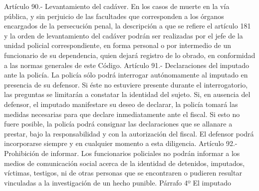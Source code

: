     Artículo 90.- Levantamiento del cadáver. En los casos de muerte en la vía pública, y sin perjuicio de las facultades que corresponden a los órganos encargados de la persecución penal, la descripción a que se refiere el artículo 181 y la orden de levantamiento del cadáver podrán ser realizadas por el jefe de la unidad policial correspondiente, en forma personal o por intermedio de un funcionario de su dependencia, quien dejará registro de lo obrado, en conformidad a las normas generales de este Código.
    Artículo 91.- Declaraciones del imputado ante la policía. La policía sólo podrá interrogar autónomamente al imputado en presencia de su defensor. Si éste no estuviere presente durante el interrogatorio, las preguntas se limitarán a constatar la identidad del sujeto.
    Si, en ausencia del defensor, el imputado manifestare su deseo de declarar, la policía tomará las medidas necesarias para que declare inmediatamente ante el fiscal. Si esto no fuere posible, la policía podrá consignar las declaraciones que se allanare a prestar, bajo la responsabilidad y con la autorización del fiscal. El defensor podrá incorporarse siempre y en cualquier momento a esta diligencia.
    Artículo 92.- Prohibición de informar. Los funcionarios policiales no podrán informar a los medios de comunicación social acerca de la identidad de detenidos, imputados, víctimas, testigos, ni de otras personas que se encontraren o pudieren resultar vinculadas a la investigación de un hecho punible.
    Párrafo 4º El imputado

